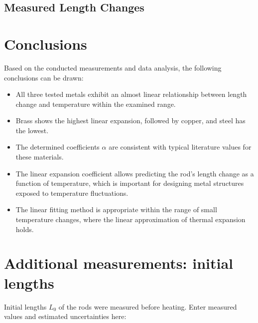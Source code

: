 \documentclass[a4paper,12pt]{article}
\begin{document}
\subsection*{Measured Length Changes}

\begin{table}[h]
\centering
{}
\caption{Measured length changes for all three metals.}
\end{table}

\section{Conclusions}

Based on the conducted measurements and data analysis, the following conclusions can be drawn:

\begin{itemize}
    \item All three tested metals exhibit an almost linear relationship between length change and temperature within the examined range.
    \item Brass shows the highest linear expansion, followed by copper, and steel has the lowest.
    \item The determined coefficients $\alpha$ are consistent with typical literature values for these materials.
    \item The linear expansion coefficient allows predicting the rod's length change as a function of temperature, which is important for designing metal structures exposed to temperature fluctuations.
    \item The linear fitting method is appropriate within the range of small temperature changes, where the linear approximation of thermal expansion holds.
\end{itemize}



\section{Additional measurements: initial lengths}

Initial lengths \(L_0\) of the rods were measured before heating. Enter measured values and estimated uncertainties here:
\end{document}

